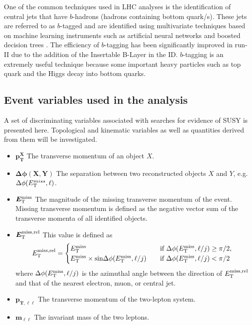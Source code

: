 One of the common techniques used in LHC analyses is the identification of central jets that have $b$-hadrons (hadrons containing bottom quark/s).  These jets are referred to as $b$-tagged and are identified using multivariate techniques based on machine learning instruments such as artificial neural networks and boosted decision trees \citep{Aad:2015ydr}. The efficiency of $b$-tagging has been significantly improved in run-II due to the addition of the Insertable B-Layer in the ID. $b$-tagging is an extremely useful technique because some important heavy particles such as top quark and the Higgs decay into bottom quarks. 

\subsection{Event variables used in the analysis}
\label{subsec:Variables}

A set of discriminating variables associated with searches for evidence of SUSY is presented here. Topological and kinematic variables as well as quantities derived from them will be investigated.

\begin{itemize}[leftmargin=0cm]
\item[]$\bm{p^X_T}$ The transverse momentum of an object $X$.
\item[]$\bm{\Delta\phi(X,Y)}$ The separation between two reconstructed objects $X$ and $Y$, e.g. ${\Delta\phi(E_{\text T}^{miss},\ell)}$.
\item[]$\bm{E_{\text T}^{\text {miss}}}$ The magnitude of the missing transverse momentum of the event. Missing transverse momentum is defined as the negative vector sum of the transverse momenta of all identified objects.
\item[]$\bm{E^{\text{miss,rel}}_{\text T}}$ This value is defined as 
\[
 E_{\text T}^{\text {miss,rel}} = 
  \begin{cases} 
   E_{\text T}^{\text {miss}}\quad & \text{if } \Delta\phi(E_{\text T}^{\text {miss}},\ell/j) \geq \pi/2, \\
   E_{\text T}^{\text {miss}}\times \text{sin}\Delta\phi(E_{\text T}^{\text {miss}},\ell/j) \quad      & \text{if } \Delta\phi(E_{\text T}^{\text {miss}},\ell/j)<\pi/2
  \end{cases}
\]
where $\Delta\phi(E_{\text T}^{\text {miss}},\ell/j)$ is the azimuthal angle between the direction of $E_{\text T}^{\text {miss,rel}}$ and that of the nearest electron, muon, or central jet. 
\item[]$\bm{p_{T,\ell \ell}}$ The transverse momentum of the two-lepton system. 
\item[]$\bm{m_{\ell \ell}}$ The invariant mass of the two leptons.
\end{itemize}

